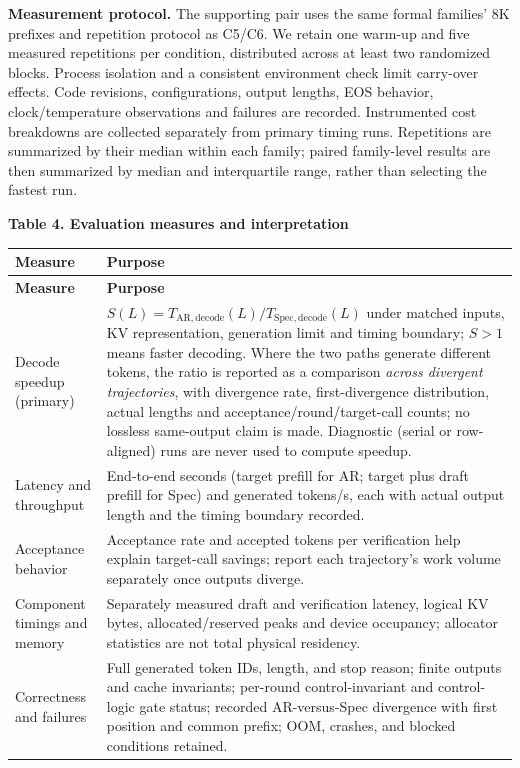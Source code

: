 \documentclass[11pt,a4paper]{article}
\begin{document}
\textbf{Measurement protocol.} The supporting pair uses the same formal families' 8K prefixes and repetition protocol as C5/C6. We retain one warm-up and five measured repetitions per condition, distributed across at least two randomized blocks. Process isolation and a consistent environment check limit carry-over effects. Code revisions, configurations, output lengths, EOS behavior, clock/temperature observations and failures are recorded. Instrumented cost breakdowns are collected separately from primary timing runs. Repetitions are summarized by their median within each family; paired family-level results are then summarized by median and interquartile range, rather than selecting the fastest run.

\textbf{Table 4. Evaluation measures and interpretation}\par
\begin{longtable}{@{}>{\raggedright\arraybackslash}p{3.1cm} >{\raggedright\arraybackslash}p{12.4cm}@{}}
\toprule
\textbf{Measure} & \textbf{Purpose} \\
\midrule
\endfirsthead
\toprule
\textbf{Measure} & \textbf{Purpose} \\
\midrule
\endhead
Decode speedup (primary) & $S(L)=T_{\mathrm{AR,decode}}(L)/T_{\mathrm{Spec,decode}}(L)$ under matched inputs, KV representation, generation limit and timing boundary; $S>1$ means faster decoding. Where the two paths generate different tokens, the ratio is reported as a comparison \emph{across divergent trajectories}, with divergence rate, first-divergence distribution, actual lengths and acceptance/round/target-call counts; no lossless same-output claim is made. Diagnostic (serial or row-aligned) runs are never used to compute speedup. \\
Latency and throughput & End-to-end seconds (target prefill for AR; target plus draft prefill for Spec) and generated tokens/s, each with actual output length and the timing boundary recorded. \\
Acceptance behavior & Acceptance rate and accepted tokens per verification help explain target-call savings; report each trajectory's work volume separately once outputs diverge. \\
Component timings and memory & Separately measured draft and verification latency, logical KV bytes, allocated/reserved peaks and device occupancy; allocator statistics are not total physical residency. \\
Correctness and failures & Full generated token IDs, length, and stop reason; finite outputs and cache invariants; per-round control-invariant and control-logic gate status; recorded AR-versus-Spec divergence with first position and common prefix; OOM, crashes, and blocked conditions retained. \\
\bottomrule
\end{longtable}
\end{document}
